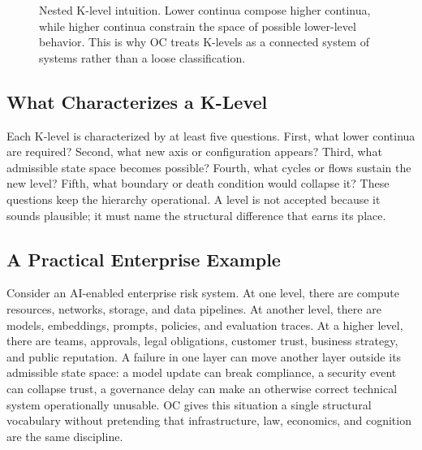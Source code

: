 \begin{figure}[htbp]
\centering
{}
\caption{Nested K-level intuition. Lower continua compose higher continua, while higher continua constrain the space of possible lower-level behavior. This is why OC treats K-levels as a connected system of systems rather than a loose classification.}
\label{fig:r006-nested-k-levels}
\end{figure}

\subsection{What Characterizes a K-Level}

Each K-level is characterized by at least five questions. First, what lower
continua are required? Second, what new axis or configuration appears? Third,
what admissible state space becomes possible? Fourth, what cycles or flows
sustain the new level? Fifth, what boundary or death condition would collapse
it? These questions keep the hierarchy operational. A level is not accepted
because it sounds plausible; it must name the structural difference that earns
its place.

\subsection{A Practical Enterprise Example}

Consider an AI-enabled enterprise risk system. At one level, there are compute
resources, networks, storage, and data pipelines. At another level, there are
models, embeddings, prompts, policies, and evaluation traces. At a higher
level, there are teams, approvals, legal obligations, customer trust, business
strategy, and public reputation. A failure in one layer can move another layer
outside its admissible state space: a model update can break compliance, a
security event can collapse trust, a governance delay can make an otherwise
correct technical system operationally unusable. OC gives this situation a
single structural vocabulary without pretending that infrastructure, law,
economics, and cognition are the same discipline.

